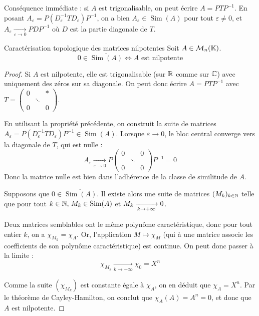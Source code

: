 \begin{remarque}
    Conséquence immédiate : si $A$ est trigonalisable, on peut écrire $A = P T P^{-1}$. En posant $A_\varepsilon = P (D_\varepsilon^{-1} T D_\varepsilon) P^{-1}$, on a bien $A_\varepsilon \in \operatorname{Sim}(A)$ pour tout $\varepsilon \neq 0$, et $A_\varepsilon \xrightarrow[\varepsilon \to 0]{} P D P^{-1}$ où $D$ est la partie diagonale de $T$.
\end{remarque}

\begin{proposition}{Caractérisation topologique des matrices nilpotentes}{}
    Soit $A \in \mathcal{M}_n(\mathbb{K})$.
    \[ 0 \in \overline{\operatorname{Sim}(A)} \iff A \text{ est nilpotente} \]
\end{proposition}

\begin{proof}
    
    \svspace
    Si $A$ est nilpotente, elle est trigonalisable (sur $\mathbb{R}$ comme sur $\mathbb{C}$) avec uniquement des zéros sur sa diagonale. On peut donc écrire $A = P T P^{-1}$ avec $T = \begin{pmatrix} 0 & & * \\ & \ddots & \\ 0 & & 0 \end{pmatrix}$.
    
    En utilisant la propriété précédente, on construit la suite de matrices $A_\varepsilon = P (D_\varepsilon^{-1} T D_\varepsilon) P^{-1} \in \operatorname{Sim}(A)$. 
    Lorsque $\varepsilon \to 0$, le bloc central converge vers la diagonale de $T$, qui est nulle :
    \[ A_\varepsilon \xrightarrow[\varepsilon \to 0]{} P \begin{pmatrix} 0 & & 0 \\ & \ddots & \\ 0 & & 0 \end{pmatrix} P^{-1} = 0 \]
    Donc la matrice nulle est bien dans l'adhérence de la classe de similitude de $A$.

    
    \svspace
    Supposons que $0 \in \overline{\operatorname{Sim}(A)}$. Il existe alors une suite de matrices $(M_k)_{k\in\mathbb{N}}$ telle que pour tout $k \in \mathbb{N}, \, M_k \in \operatorname{Sim}(A)$ et $M_k \xrightarrow[k \to +\infty]{} 0$.
    
    Deux matrices semblables ont le même polynôme caractéristique, donc pour tout entier $k$, on a $\chi_{M_k} = \chi_A$.
    Or, l'application $M \mapsto \chi_M$ (qui à une matrice associe les coefficients de son polynôme caractéristique) est continue. On peut donc passer à la limite :
    \[ \chi_{M_k} \xrightarrow[k \to +\infty]{} \chi_0 = X^n \]
    
    Comme la suite $(\chi_{M_k})$ est constante égale à $\chi_A$, on en déduit que $\chi_A = X^n$.
    Par le théorème de Cayley-Hamilton, on conclut que $\chi_A(A) = A^n = 0$, et donc que $A$ est nilpotente.
\end{proof}